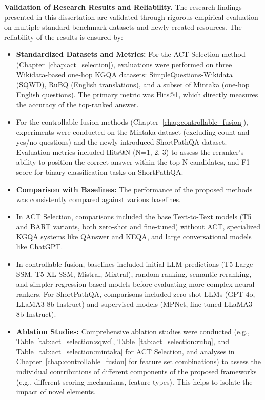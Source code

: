 \textbf{Validation of Research Results and Reliability.}
The research findings presented in this dissertation are validated through rigorous empirical evaluation on multiple standard benchmark datasets and newly created resources. The reliability of the results is ensured by:
\begin{itemize}
    \item \textbf{Standardized Datasets and Metrics:} For the ACT Selection method (Chapter~\ref{chap:act_selection}), evaluations were performed on three Wikidata-based one-hop KGQA datasets: SimpleQuestions-Wikidata (SQWD), RuBQ (English translations), and a subset of Mintaka (one-hop English questions). The primary metric was Hits@1, which directly measures the accuracy of the top-ranked answer.
    \item For the controllable fusion methods (Chapter~\ref{chap:controllable_fusion}), experiments were conducted on the Mintaka dataset (excluding count and yes/no questions) and the newly introduced ShortPathQA dataset. Evaluation metrics included Hits@N (N=1, 2, 3) to assess the reranker's ability to position the correct answer within the top N candidates, and F1-score for binary classification tasks on ShortPathQA.
    \item \textbf{Comparison with Baselines:} The performance of the proposed methods was consistently compared against various baselines.
        \item In ACT Selection, comparisons included the base Text-to-Text models (T5 and BART variants, both zero-shot and fine-tuned) without ACT, specialized KGQA systems like QAnswer and KEQA, and large conversational models like ChatGPT.
        \item In controllable fusion, baselines included initial LLM predictions (T5-Large-SSM, T5-XL-SSM, Mistral, Mixtral), random ranking, semantic reranking, and simpler regression-based models before evaluating more complex neural rankers. For ShortPathQA, comparisons included zero-shot LLMs (GPT-4o, LLaMA3-8b-Instruct) and supervised models (MPNet, fine-tuned LLaMA3-8b-Instruct).
    \item \textbf{Ablation Studies:} Comprehensive ablation studies were conducted (e.g., Table~\ref{tab:act_selection:sqwd}, Table~\ref{tab:act_selection:rubq}, and Table~\ref{tab:act_selection:mintaka} for ACT Selection, and analyses in Chapter~\ref{chap:controllable_fusion} for feature set combinations) to assess the individual contributions of different components of the proposed frameworks (e.g., different scoring mechanisms, feature types). This helps to isolate the impact of novel elements.

\end{itemize}

